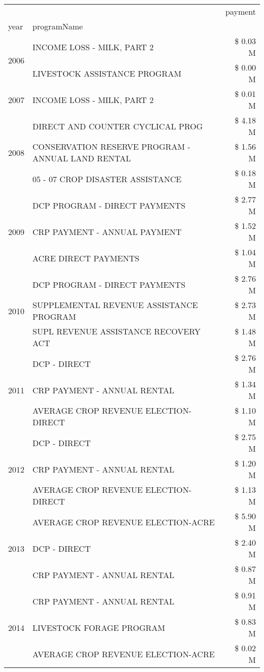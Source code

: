 \begin{tabular}{llr}
\toprule
 &  & payment \\
year & programName &  \\
\midrule
\multirow[t]{2}{*}{2006} & INCOME LOSS - MILK, PART 2 & \$ 0.03 M \\
 & LIVESTOCK ASSISTANCE PROGRAM & \$ 0.00 M \\
\cline{1-3}
2007 & INCOME LOSS - MILK, PART 2 & \$ 0.01 M \\
\cline{1-3}
\multirow[t]{3}{*}{2008} & DIRECT AND COUNTER CYCLICAL PROG & \$ 4.18 M \\
 & CONSERVATION RESERVE PROGRAM - ANNUAL LAND RENTAL & \$ 1.56 M \\
 & 05 - 07 CROP DISASTER ASSISTANCE & \$ 0.18 M \\
\cline{1-3}
\multirow[t]{3}{*}{2009} & DCP PROGRAM - DIRECT PAYMENTS & \$ 2.77 M \\
 & CRP PAYMENT - ANNUAL PAYMENT & \$ 1.52 M \\
 & ACRE DIRECT PAYMENTS & \$ 1.04 M \\
\cline{1-3}
\multirow[t]{3}{*}{2010} & DCP PROGRAM - DIRECT PAYMENTS & \$ 2.76 M \\
 & SUPPLEMENTAL REVENUE ASSISTANCE PROGRAM & \$ 2.73 M \\
 & SUPL REVENUE ASSISTANCE RECOVERY ACT & \$ 1.48 M \\
\cline{1-3}
\multirow[t]{3}{*}{2011} & DCP - DIRECT & \$ 2.76 M \\
 & CRP PAYMENT - ANNUAL RENTAL & \$ 1.34 M \\
 & AVERAGE CROP REVENUE ELECTION-DIRECT & \$ 1.10 M \\
\cline{1-3}
\multirow[t]{3}{*}{2012} & DCP - DIRECT & \$ 2.75 M \\
 & CRP PAYMENT - ANNUAL RENTAL & \$ 1.20 M \\
 & AVERAGE CROP REVENUE ELECTION-DIRECT & \$ 1.13 M \\
\cline{1-3}
\multirow[t]{3}{*}{2013} & AVERAGE CROP REVENUE ELECTION-ACRE & \$ 5.90 M \\
 & DCP - DIRECT & \$ 2.40 M \\
 & CRP PAYMENT - ANNUAL RENTAL & \$ 0.87 M \\
\cline{1-3}
\multirow[t]{3}{*}{2014} & CRP PAYMENT - ANNUAL RENTAL & \$ 0.91 M \\
 & LIVESTOCK FORAGE PROGRAM & \$ 0.83 M \\
 & AVERAGE CROP REVENUE ELECTION-ACRE & \$ 0.02 M \\
\cline{1-3}

\end{tabular}
